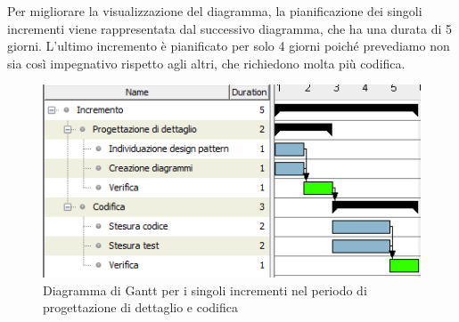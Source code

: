Per migliorare la visualizzazione del diagramma, la pianificazione dei singoli incrementi viene rappresentata dal successivo diagramma, che ha una durata di 5 giorni. L'ultimo incremento è pianificato per solo 4 giorni poiché prevediamo non sia così impegnativo rispetto agli altri, che richiedono molta più codifica.\\

\begin{figure}[H]
\centering

\centerline{\includegraphics[scale=1]{res/Pianificazione/Gantt/incrementoCodifica}}
\caption{Diagramma di Gantt per i singoli incrementi nel periodo di progettazione di dettaglio e codifica}
\end{figure}

